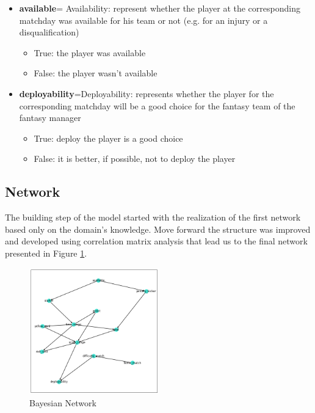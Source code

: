 \documentclass[a4paper,10pt]{report}
\begin{document}
\begin{itemize}
    \item \textbf{available}= Availability: represent whether the player at the corresponding matchday was available for his team or not (e.g. for an injury or a disqualification)
    \begin{itemize}
        \item True: the player was available
        \item False: the player wasn't available
    \end{itemize}
    
    \item \textbf{deployability}=Deployability: represents whether the player for the corresponding matchday will be a good choice for the fantasy team of the fantasy manager
    \begin{itemize}
        \item True: deploy the player is a good choice
        \item False: it is better, if possible, not to deploy the player
    \end{itemize}
    
\end{itemize}

\newpage
\subsection{Network}\label{subsec:subsection-412}
The building step of the model started with the realization of the first network based only on the domain's knowledge. Move forward the structure was improved and developed using correlation matrix analysis that lead us to the final network presented in Figure \ref{fig:bayesianNet}.

\begin{figure}[h]
    \centering
    \includegraphics[width=0.5\textwidth]{assets/img/Network.png}
    \caption{Bayesian Network}
    \label{fig:bayesianNet}
\end{figure}
\end{document}
